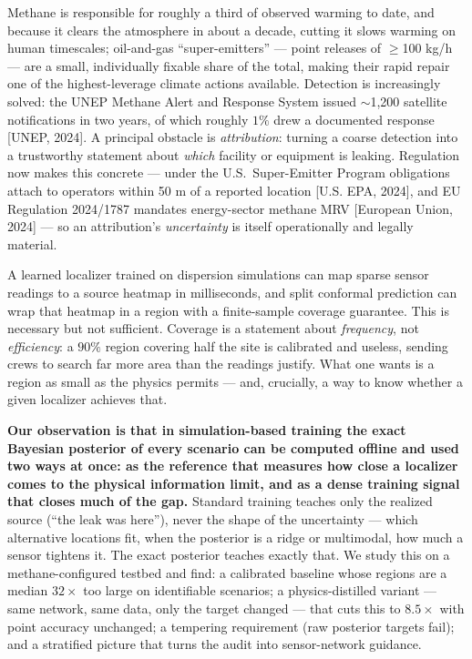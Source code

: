 \documentclass{article}
\begin{document}
Methane is responsible for roughly a third of observed warming to date, and because it
clears the atmosphere in about a decade, cutting it slows warming on human timescales;
oil-and-gas ``super-emitters'' --- point releases of $\geq$100 kg/h --- are a small,
individually fixable share of the total, making their rapid repair one of the
highest-leverage climate actions available. Detection is increasingly solved: the UNEP
Methane Alert and Response System issued $\sim$1,200 satellite notifications in two years,
of which roughly $1\%$ drew a documented response [UNEP, 2024]. A principal obstacle is
\emph{attribution}: turning a coarse detection into a trustworthy statement about
\emph{which} facility or equipment is leaking. Regulation now makes this concrete --- under
the U.S.\ Super-Emitter Program obligations attach to operators within 50 m of a reported
location [U.S. EPA, 2024], and EU Regulation 2024/1787 mandates energy-sector methane MRV
[European Union, 2024] --- so an attribution's \emph{uncertainty} is itself operationally
and legally material.

A learned localizer trained on dispersion simulations can map sparse sensor readings to a
source heatmap in milliseconds, and split conformal prediction can wrap that heatmap in a
region with a finite-sample coverage guarantee. This is necessary but not sufficient.
Coverage is a statement about \emph{frequency}, not \emph{efficiency}: a $90\%$ region
covering half the site is calibrated and useless, sending crews to search far more area
than the readings justify. What one wants is a region as small as the physics permits ---
and, crucially, a way to know whether a given localizer achieves that.

\textbf{Our observation is that in simulation-based training the exact Bayesian posterior
of every scenario can be computed offline and used two ways at once: as the reference
that measures how close a localizer comes to the physical information limit, and as a
dense training signal that closes much of the gap.} Standard training teaches only the
realized source (``the leak was here''), never the shape of the uncertainty --- which
alternative locations fit, when the posterior is a ridge or multimodal, how much a sensor
tightens it. The exact posterior teaches exactly that. We study this on a
methane-configured testbed and find: a calibrated baseline whose regions are a median
$32\times$ too large on identifiable scenarios; a physics-distilled variant --- same
network, same data, only the target changed --- that cuts this to $8.5\times$ with point
accuracy unchanged; a tempering requirement (raw posterior targets fail); and a stratified
picture that turns the audit into sensor-network guidance.
\end{document}
